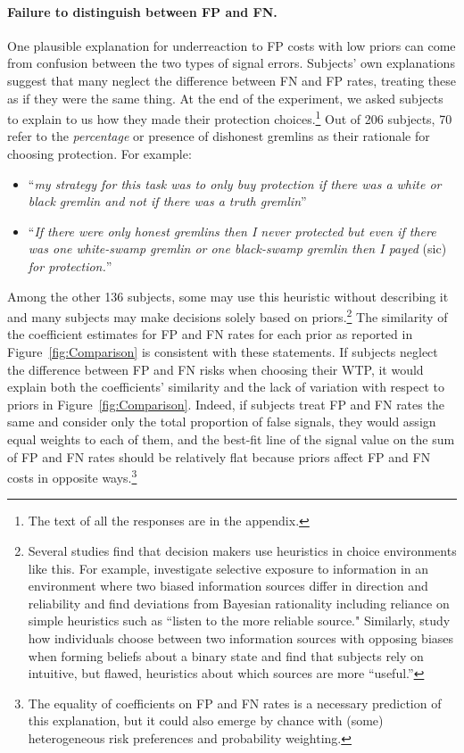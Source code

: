\documentclass[12pt,a4paper]{article}
\begin{document}
\paragraph{Failure to distinguish between FP and FN.} One plausible explanation for underreaction to FP costs with low priors can come from confusion between the two types of signal errors. Subjects' own explanations suggest that many neglect the difference between FN and FP rates, treating these as if they were the same thing. At the end of the experiment, we asked subjects to explain to us how they made their protection choices.\footnote{The text of all the responses are in the appendix.} Out of 206 subjects, 70 refer to the \emph{percentage}  or presence of dishonest gremlins as their rationale for choosing protection. For example:
\begin{itemize}
	\item ``\emph{my strategy for this task was to only buy protection if there was a white or black gremlin and not if there was a truth gremlin}''
	\item ``\emph{If there were only honest gremlins then I never protected but even if there was one white-swamp gremlin or one black-swamp gremlin then I payed} (sic) \emph{for protection.}''
\end{itemize}

Among the other 136 subjects, some may use this heuristic without describing it and many subjects may make decisions solely based on priors.\footnote{Several studies find that decision makers use heuristics in choice environments like this.  For example, \citet{MontanariNunnari2023} investigate selective exposure to information in an environment where two biased information sources differ in direction and reliability and find deviations from Bayesian rationality including reliance on simple heuristics such as ``listen to the more reliable source."  Similarly, \citet{CharnessOpreaYuksel2021} study how individuals choose between two information sources with opposing biases when forming beliefs about a binary state and find that subjects rely on intuitive, but flawed, heuristics about which sources are more “useful.”} The similarity of the coefficient estimates for FP and FN rates for each prior as reported in Figure~\ref{fig:Comparison} is consistent with these statements. If subjects neglect the difference between FP and FN risks when choosing their WTP, it would explain both the coefficients' similarity and the lack of variation with respect to priors in Figure~\ref{fig:Comparison}. Indeed, if subjects treat FP and FN rates the same and consider only the total proportion of false signals, they would assign equal weights to each of them, and the best-fit line of the signal value on the sum of FP and FN rates should be relatively flat because priors affect FP and FN costs in opposite ways.\footnote{The equality of coefficients on FP and FN rates is a necessary prediction of this explanation, but it could also emerge by chance with (some) heterogeneous risk preferences and probability weighting.}
\end{document}
